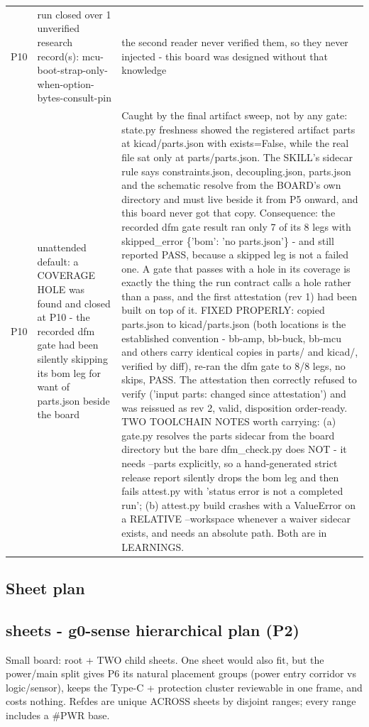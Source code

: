 \documentclass[11pt,a4paper]{article}
\begin{document}
{\begin{longtable}{lp{5.2cm}p{7.2cm}}
P10 & run closed over 1 unverified research record(s): mcu-boot-strap-only-when-option-bytes-consult-pin & the second reader never verified them, so they never injected - this board was designed without that knowledge \\
P10 & unattended default: a COVERAGE HOLE was found and closed at P10 - the recorded dfm gate had been silently skipping its bom leg for want of parts.json beside the board & Caught by the final artifact sweep, not by any gate: state.py freshness showed the registered artifact parts at kicad/parts.json with exists=False, while the real file sat only at parts/parts.json. The SKILL's sidecar rule says constraints.json, decoupling.json, parts.json and the schematic resolve from the BOARD's own directory and must live beside it from P5 onward, and this board never got that copy. Consequence: the recorded dfm gate result ran only 7 of its 8 legs with skipped\_error \{'bom': 'no parts.json'\} - and still reported PASS, because a skipped leg is not a failed one. A gate that passes with a hole in its coverage is exactly the thing the run contract calls a hole rather than a pass, and the first attestation (rev 1) had been built on top of it. FIXED PROPERLY: copied parts.json to kicad/parts.json (both locations is the established convention - bb-amp, bb-buck, bb-mcu and others carry identical copies in parts/ and kicad/, verified by diff), re-ran the dfm gate to 8/8 legs, no skips, PASS. The attestation then correctly refused to verify ('input parts: changed since attestation') and was reissued as rev 2, valid, disposition order-ready. TWO TOOLCHAIN NOTES worth carrying: (a) gate.py resolves the parts sidecar from the board directory but the bare dfm\_check.py does NOT - it needs --parts explicitly, so a hand-generated strict release report silently drops the bom leg and then fails attest.py with 'status error is not a completed run'; (b) attest.py build crashes with a ValueError on a RELATIVE --workspace whenever a waiver sidecar exists, and needs an absolute path. Both are in LEARNINGS. \\
\bottomrule
\end{longtable}
}
\subsection*{Sheet plan}
\subsection*{sheets - g0-sense hierarchical plan (P2)}
Small board: root + TWO child sheets. One sheet would also fit, but the power/main split gives P6 its natural placement groups (power entry corridor vs logic/sensor), keeps the Type-C + protection cluster reviewable in one frame, and costs nothing. Refdes are unique ACROSS sheets by disjoint ranges; every range includes a \#PWR base.
\end{document}
